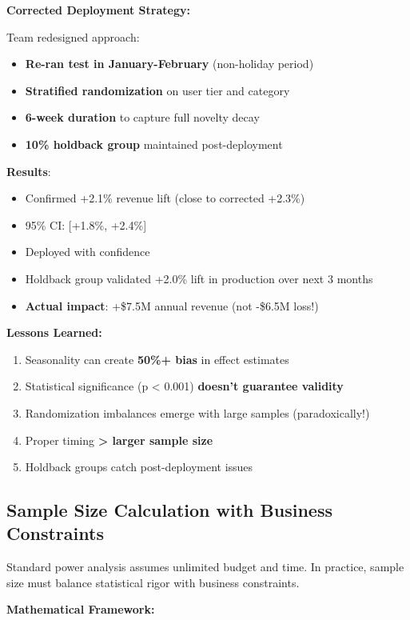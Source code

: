 \textbf{Corrected Deployment Strategy:}

Team redesigned approach:
\begin{itemize}
    \item \textbf{Re-ran test in January-February} (non-holiday period)
    \item \textbf{Stratified randomization} on user tier and category
    \item \textbf{6-week duration} to capture full novelty decay
    \item \textbf{10\% holdback group} maintained post-deployment
\end{itemize}

\textbf{Results}:
\begin{itemize}
    \item Confirmed +2.1\% revenue lift (close to corrected +2.3\%)
    \item 95\% CI: [+1.8\%, +2.4\%]
    \item Deployed with confidence
    \item Holdback group validated +2.0\% lift in production over next 3 months
    \item \textbf{Actual impact}: +\$7.5M annual revenue (not -\$6.5M loss!)
\end{itemize}

\textbf{Lessons Learned:}
\begin{enumerate}
    \item Seasonality can create \textbf{50\%+ bias} in effect estimates
    \item Statistical significance (p < 0.001) \textbf{doesn't guarantee validity}
    \item Randomization imbalances emerge with large samples (paradoxically!)
    \item Proper timing \textbf{> larger sample size}
    \item Holdback groups catch post-deployment issues
\end{enumerate}

\subsection{Sample Size Calculation with Business Constraints}

Standard power analysis assumes unlimited budget and time. In practice, sample size must balance statistical rigor with business constraints.

\textbf{Mathematical Framework:}

